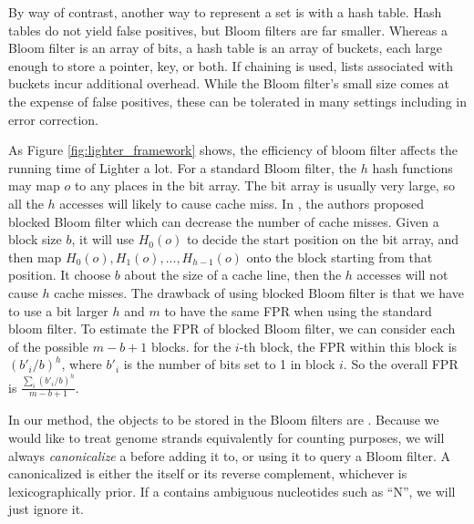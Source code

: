 \documentclass[10pt]{article}
\begin{document}
By way of contrast, another way to represent a set is with a hash table.  Hash tables do not yield false positives, but Bloom filters are far smaller.  Whereas a Bloom filter is an array of bits, a hash table is an array of buckets, each large enough to store a pointer, key, or both.  If chaining is used, lists associated with buckets incur additional overhead.  While the Bloom filter's small size comes at the expense of false positives, these can be tolerated in many settings including in error correction.

As Figure \ref{fig:lighter_framework} shows, the efficiency of bloom filter affects the running time of Lighter a lot. For a standard Bloom filter, the $h$ hash functions may map $o$ to any places in the bit array. The bit array is usually very large, so all the $h$ accesses will likely to cause cache miss. In \cite{Putze:2010:CHS:1498698.1594230}, the authors proposed blocked Bloom filter which can decrease the number of cache misses. Given a block size $b$, it will use $H_0(o)$ to decide the start position on the bit array, and then map $H_0(o), H_1(o),...,H_{h-1}(o)$ onto the block starting from that position. It choose $b$ about the size of a cache line, then the $h$ accesses will not cause $h$ cache misses. The drawback of using blocked Bloom filter is that we have to use a bit larger $h$ and $m$ to have the same FPR when using the standard bloom filter. To estimate the FPR of blocked Bloom filter, we can consider each of the possible $m-b+1$ blocks. for the $i$-th block, the FPR within this block is $(b'_i/b)^h$, where $b'_i$ is the number of bits set to 1 in block $i$. So the overall FPR is $\displaystyle\frac{\sum_i (b'_i/b)^h}{m-b+1}$.

In our method, the objects to be stored in the Bloom filters are \kmers.  Because we would like to treat genome strands equivalently for counting purposes, we will always \emph{canonicalize} a \kmer before adding it to, or using it to query a Bloom filter.  A canonicalized \kmer is either the \kmer itself or its reverse complement, whichever is lexicographically prior. If a \kmer contains ambiguous nucleotides such as ``N'', we will just ignore it.

\end{document}
